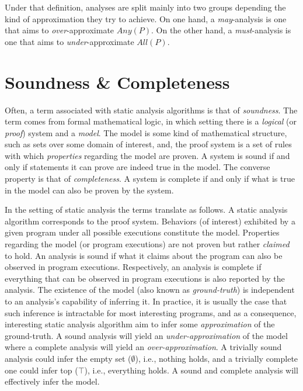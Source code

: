 Under that definition, analyses are split mainly into two groups depending the kind of approximation they try to achieve. On one hand, a \emph{may}-analysis is one that aims to \emph{over}-approximate $Any(P)$. On the other hand, a \emph{must}-analysis is one that aims to \emph{under}-approximate $All(P)$.

\color{red}
\section{Soundness \& Completeness}

Often, a term associated with static analysis algorithms is that of \emph{soundness}. The term comes from formal mathematical logic, in which setting there is a \emph{logical} (or \emph{proof}) system and a \emph{model}. The model is some kind of mathematical structure, such as sets over some domain of interest, and, the proof system is a set of rules with which \emph{properties} regarding the model are proven. A system is sound if and only if statements it can prove are indeed true in the model. The converse property is that of \emph{completeness}. A system is complete if and only if what is true in the model can also be proven by the system.

In the setting of static analysis the terms translate as follows. A static analysis algorithm corresponds to the proof system. Behaviors (of interest) exhibited by a given program under all possible executions constitute the model. Properties regarding the model (or program executions) are not proven but rather \emph{claimed} to hold. An analysis is sound if what it claims about the program can also be observed in program executions. Respectively, an analysis is complete if everything that can be observed in program executions is also reported by the analysis. The existence of the model (also known as \emph{ground-truth}) is independent to an analysis's capability of inferring it. In practice, it is usually the case that such inference is intractable for most interesting programs, and as a consequence, interesting static analysis algorithm aim to infer some \emph{approximation} of the ground-truth. A sound analysis will yield an \emph{under-approximation} of the model where a complete analysis will yield an \emph{over-approximation}. A trivially sound analysis could infer the empty set ($\emptyset$), i.e., nothing holds, and a trivially complete one could infer top ($\top$), i.e., everything holds. A sound and complete analysis will effectively infer the model.

